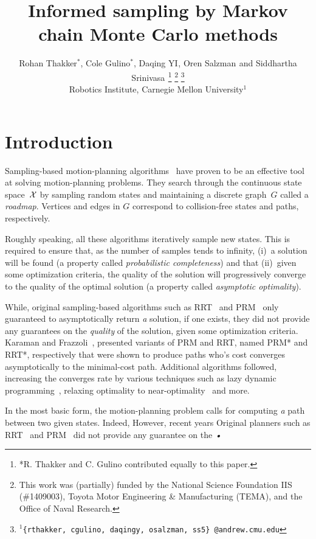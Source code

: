 \documentclass[letterpaper, 10 pt, conference]{ieeeconf}  %
\title{\LARGE \bf
Informed sampling by Markov chain Monte Carlo methods
}
\author{
Rohan Thakker$^{*}$,
Cole Gulino$^{*}$,
Daqing YI$^{}$,
Oren Salzman$^{}$ and
Siddhartha Srinivasa$^{}$%
\thanks{*R. Thakker and C. Gulino contributed equally to this paper.}
\thanks{This work was (partially) funded by the National Science Foundation IIS (\#1409003), Toyota Motor Engineering \& Manufacturing (TEMA), and the Office of Naval Research.}%
\thanks{$^{1}${\tt\small \{rthakker, cgulino, daqingy, osalzman, ss5\} @andrew.cmu.edu}}%
%
\\        
Robotics Institute, Carnegie Mellon University$^{1}$
}
\begin{document}
\maketitle
\thispagestyle{empty}
\pagestyle{empty}


\begin{abstract}

\end{abstract}


\section{Introduction}
Sampling-based motion-planning algorithms~\cite{CBHKKLT05, L06} have proven to be an effective tool at solving motion-planning problems.
They search through the continuous state space~$\mathcal{X}$ by sampling random states and maintaining a discrete graph~$G$ called a \emph{roadmap}.
Vertices and edges in $G$ correspond to collision-free states and paths, respectively.

Roughly speaking, all these algorithms iteratively sample new states.
This is required to ensure that, as the number of samples tends to infinity, 
(i)~a solution will be found 
(a property called \emph{probabilistic completeness})
and that
(ii)~given some optimization criteria, the quality of the solution will progressively converge to the quality of the optimal solution
(a property called \emph{asymptotic  optimality}).



While, original sampling-based algorithms such as RRT~\cite{LK01} and PRM~\cite{KSLO96} only guaranteed to asymptotically return \emph{a} solution, if one exists, they did not provide any guarantees on the \emph{quality} of the solution, given some optimization criteria.
Karaman and Frazzoli~\cite{KF11}, presented variants of PRM and RRT, named PRM* and RRT*, respectively that were shown to produce paths who's cost converges asymptotically to the minimal-cost path.
Additional algorithms followed, increasing the converges rate by various techniques such as lazy dynamic programming~\cite{GSB15, JSCP15}, relaxing optimality to near-optimality~\cite{DB14, SH16} and more.


In the most basic form, the motion-planning problem calls for computing \emph{a} path between two given states.
Indeed, 
However, recent years 
Original planners such as RRT~\cite{LK01} and PRM~\cite{KSLO96} did not provide any guarantee on the \emph{•}
\end{document}
